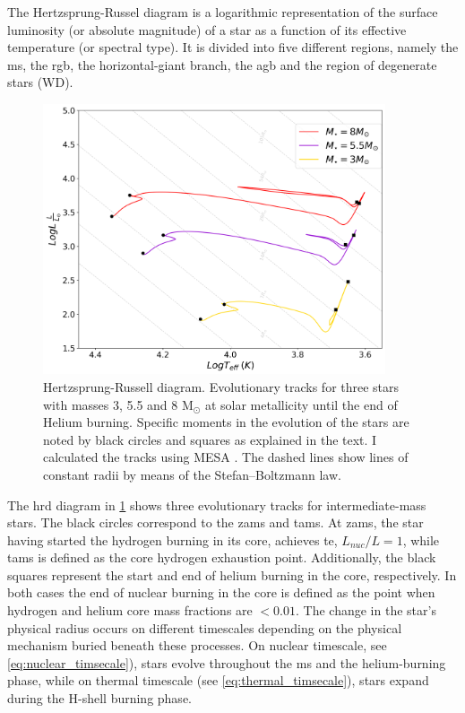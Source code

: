 The Hertzsprung-Russel diagram is a logarithmic representation of the surface luminosity (or absolute magnitude) of a star as a function of its effective temperature (or spectral type). It is divided into five different regions, namely the \ac{ms}, the \ac{rgb}, the horizontal-giant branch, the \ac{agb} and the region of degenerate stars (WD). 
\begin{figure}[H]
    \centering
    \includegraphics[width=0.9\textwidth]{Thesis/graphs/HR_inter_stars.pdf}
    \caption{Hertzsprung-Russell diagram. Evolutionary tracks for three stars with masses 3, 5.5 and 8 M$_{\odot}$ at solar metallicity until the end of Helium burning. Specific moments in the evolution of the stars are noted by black circles and squares as explained in the text. I calculated the tracks using MESA \citep{paxton2010modules,paxton2013modules,paxton2015modules,paxton2019modules}. The dashed lines show lines of constant radii by means of the Stefan–Boltzmann law.}
    \label{fig:HR_inter_stars}
\end{figure}
The \ac{hrd} diagram in \cref{fig:HR_inter_stars} shows three evolutionary tracks for intermediate-mass stars. The black circles correspond to the \ac{zams} and \ac{tams}. At \ac{zams}, the star having started the hydrogen burning in its core, achieves \ac{te}, $L_{nuc}/L =1$, while \ac{tams} is defined as the core hydrogen exhaustion point. Additionally, the black squares represent the start and end of helium burning in the core, respectively. In both cases the end of nuclear burning in the core is defined as the point when hydrogen and helium core mass fractions are $< 0.01$. The change in the star's physical radius occurs on different timescales depending on the physical mechanism buried beneath these processes. On nuclear timescale, see \cref{eq:nuclear_timsecale}), stars evolve throughout the \ac{ms} and the helium-burning phase, while on thermal timescale (see  \cref{eq:thermal_timsecale}), stars expand during the H-shell burning phase.
